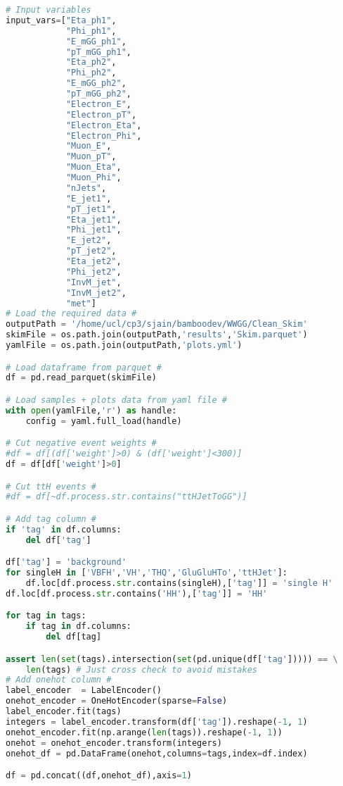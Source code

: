 \begin{lstlisting}[language=Python, caption=DNN setup for the \wwgg semi-leptonic final state, label={dnncode}]
# Input variables
input_vars=["Eta_ph1",
            "Phi_ph1",
            "E_mGG_ph1",
            "pT_mGG_ph1",
            "Eta_ph2",
            "Phi_ph2",
            "E_mGG_ph2",
            "pT_mGG_ph2",
            "Electron_E",
            "Electron_pT",
            "Electron_Eta",
            "Electron_Phi",
            "Muon_E",
            "Muon_pT",
            "Muon_Eta",
            "Muon_Phi",
            "nJets",
            "E_jet1",
            "pT_jet1",
            "Eta_jet1",
            "Phi_jet1",
            "E_jet2",
            "pT_jet2",
            "Eta_jet2",
            "Phi_jet2",
            "InvM_jet",
            "InvM_jet2",
            "met"]
# Load the required data #
outputPath = '/home/ucl/cp3/sjain/bamboodev/WWGG/Clean_Skim'
skimFile = os.path.join(outputPath,'results','Skim.parquet')
yamlFile = os.path.join(outputPath,'plots.yml')

# Load dataframe from parquet #
df = pd.read_parquet(skimFile)

# Load samples + plots data from yaml file #
with open(yamlFile,'r') as handle:
    config = yaml.full_load(handle)

# Cut negative event weights #
#df = df[(df['weight']>0) & (df['weight']<300)]
df = df[df['weight']>0]

# Cut ttH events #
#df = df[~df.process.str.contains("ttHJetToGG")]

# Add tag column #
if 'tag' in df.columns:
    del df['tag']

df['tag'] = 'background'
for singleH in ['VBFH','VH','THQ','GluGluHTo','ttHJet']:
    df.loc[df.process.str.contains(singleH),['tag']] = 'single H'
df.loc[df.process.str.contains('HH'),['tag']] = 'HH'

for tag in tags:
    if tag in df.columns:
        del df[tag]

assert len(set(tags).intersection(set(pd.unique(df['tag'])))) == \
    len(tags) # Just cross check to avoid mistakes
# Add onehot column #
label_encoder  = LabelEncoder()                                                                                                                                                              
onehot_encoder = OneHotEncoder(sparse=False)
label_encoder.fit(tags)
integers = label_encoder.transform(df['tag']).reshape(-1, 1)
onehot_encoder.fit(np.arange(len(tags)).reshape(-1, 1))
onehot = onehot_encoder.transform(integers)
onehot_df = pd.DataFrame(onehot,columns=tags,index=df.index)

df = pd.concat((df,onehot_df),axis=1)


\end{lstlisting}
